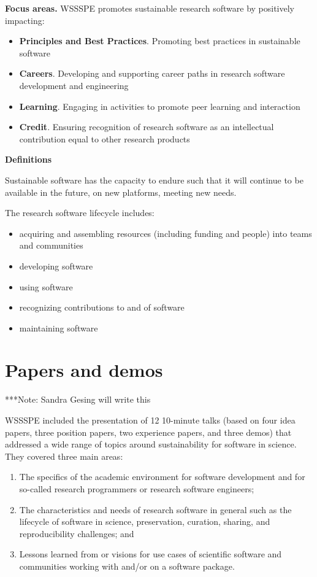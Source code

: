 \documentclass[11pt, oneside]{amsart}
\newcommand{\note}[1]{ {\textcolor{blueish}    { ***Note:      #1 }}}
\begin{document}
{\bf Focus areas.}
WSSSPE promotes sustainable research software by positively impacting:
\begin{itemize}
\item {\bf Principles and Best Practices}. Promoting best practices in sustainable software
\item {\bf Careers}. Developing and supporting career paths in research software development and engineering
\item {\bf Learning}. Engaging in activities to promote peer learning and interaction
\item {\bf Credit}. Ensuring recognition of research software as an intellectual contribution equal to other research products
\end{itemize}

{\bf Definitions}

Sustainable software has the capacity to endure such that it will continue to be available in the future, on new platforms, meeting new needs.

The research software lifecycle includes:
\begin{itemize}
\item acquiring and assembling resources (including funding and people) into teams and communities
\item developing software
\item using software
\item recognizing contributions to and of software
\item maintaining software
\end{itemize}


\section{Papers and demos} \label{sec:papers}

\note{Sandra Gesing will write this}

WSSSPE included the presentation of 12 10-minute talks (based on four idea papers, three position papers,
two experience papers, and three demos) that addressed a wide range of topics around
sustainability for software in science. They covered three main areas:
\begin{enumerate}
\item The specifics of the academic environment for software development and for so-called
research programmers or research software engineers;
\item The characteristics and needs of research software in general such as the lifecycle of
software in science, preservation, curation, sharing, and reproducibility challenges; and
\item Lessons learned from or visions for use cases of scientific software and communities
working with and\slash or on a software package.
\end{enumerate}
\end{document}
